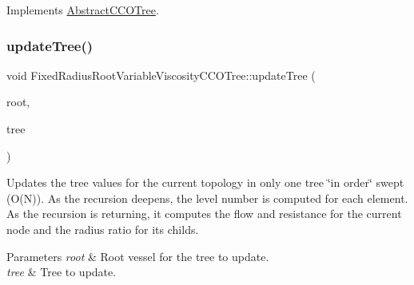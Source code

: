 Implements \mbox{\hyperlink{class_abstract_c_c_o_tree}{Abstract\+C\+C\+O\+Tree}}.

\mbox{\label{class_fixed_radius_root_variable_viscosity_c_c_o_tree_a8aa4c0c4f66bb3ae658be185accddbbb}} 
\subsubsection{\texorpdfstring{update\+Tree()}{updateTree()}}
{\footnotesize\ttfamily void Fixed\+Radius\+Root\+Variable\+Viscosity\+C\+C\+O\+Tree\+::update\+Tree (\begin{DoxyParamCaption}\item[{\mbox{\hyperlink{structvessel}{vessel}} $\ast$}]{root,  }\item[{\mbox{\hyperlink{class_fixed_radius_root_variable_viscosity_c_c_o_tree}{Fixed\+Radius\+Root\+Variable\+Viscosity\+C\+C\+O\+Tree}} $\ast$}]{tree }\end{DoxyParamCaption})\hspace{0.3cm}{\ttfamily [private]}}

Updates the tree values for the current topology in only one tree \char`\"{}in order\char`\"{} swept (O(\+N)). As the recursion deepens, the level number is computed for each element. As the recursion is returning, it computes the flow and resistance for the current node and the radius ratio for its childs. 
\begin{DoxyParams}{Parameters}
{\em root} & Root vessel for the tree to update. \\
\hline
{\em tree} & Tree to update. \\
\hline
\end{DoxyParams}
\mbox{\label{class_fixed_radius_root_variable_viscosity_c_c_o_tree_a1b03973f177c02ef19121578b4c5e625}} 
